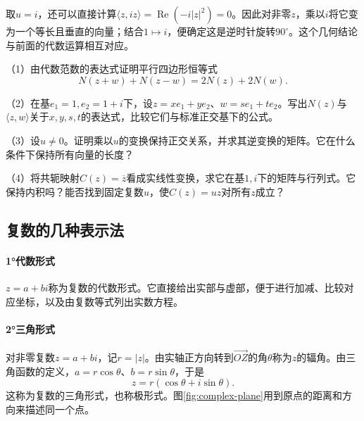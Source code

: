 取\(u=i\)，还可以直接计算\(\langle z,iz\rangle=\operatorname{Re}(-i|z|^2)=0\)。因此对非零\(z\)，乘以\(i\)将它变为一个等长且垂直的向量；结合\(1\mapsto i\)，便确定这是逆时针旋转\(90^\circ\)。这个几何结论与前面的代数运算相互对应。

\begin{exercise}
\mbox{}\par\nobreak

（1）由代数范数的表达式证明平行四边形恒等式
\begin{equation*}
 N(z+w)+N(z-w)=2N(z)+2N(w).
\end{equation*}

（2）在基\(e_1=1,e_2=1+i\)下，设\(z=xe_1+ye_2\)、\(w=se_1+te_2\)。写出\(N(z)\)与\(\langle z,w\rangle\)关于\(x,y,s,t\)的表达式，比较它们与标准正交基下的公式。

（3）设\(u\ne0\)。证明乘以\(u\)的变换保持正交关系，并求其逆变换的矩阵。它在什么条件下保持所有向量的长度？

（4）将共轭映射\(C(z)=\overline z\)看成实线性变换，求它在基\(1,i\)下的矩阵与行列式。它保持内积吗？能否找到固定复数\(u\)，使\(C(z)=uz\)对所有\(z\)成立？
\end{exercise}

\newpage
\subsection{复数的几种表示法}
\paragraph{1°代数形式} \mbox{}\nopagebreak[4]

\(z = a + b i\)称为复数的{\heiti{}代数形式}。它直接给出实部与虚部，便于进行加减、比较对应坐标，以及由复数等式列出实数方程。

\paragraph{2°三角形式} \mbox{}\nopagebreak[4]

对非零复数\(z = a + b i\)，记\(r = \left| z \right|\)。由实轴正方向转到\(\vec{O Z}\)的角\(\theta\)称为\(z\)的{\heiti{}辐角}。由三角函数的定义，\(a=r\cos\theta\)、\(b=r\sin\theta\)，于是
\begin{equation}\label{eq:complex-trig}
    z = r \left( \cos \theta + i \sin \theta \right) .
\end{equation}
这称为复数的{\heiti{}三角形式}，也称极形式。图\ref{fig:complex-plane}用到原点的距离和方向来描述同一个点。

